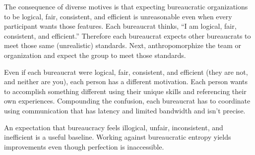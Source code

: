 The consequence of diverse motives is that expecting bureaucratic organizations to be logical, fair, consistent, and efficient is unreasonable even when every participant wants those features. Each bureaucrat thinks, ``I am logical, fair, consistent, and efficient.'' Therefore each bureaucrat expects other bureaucrats to meet those same (unrealistic) standards. Next, anthropomorphize the team or organization and expect the group to meet those standards. 

Even if each bureaucrat were logical, fair, consistent, and efficient (they are not, and neither are you), each person has a different motivation. Each person wants to accomplish something different using their unique skills and referencing their own experiences. Compounding the confusion, each bureaucrat has to coordinate using communication that has latency and limited bandwidth and isn't precise.

An expectation that bureaucracy feels illogical, unfair, inconsistent, and inefficient is a useful baseline. Working against bureaucratic entropy yields improvements even though perfection is inaccessible.